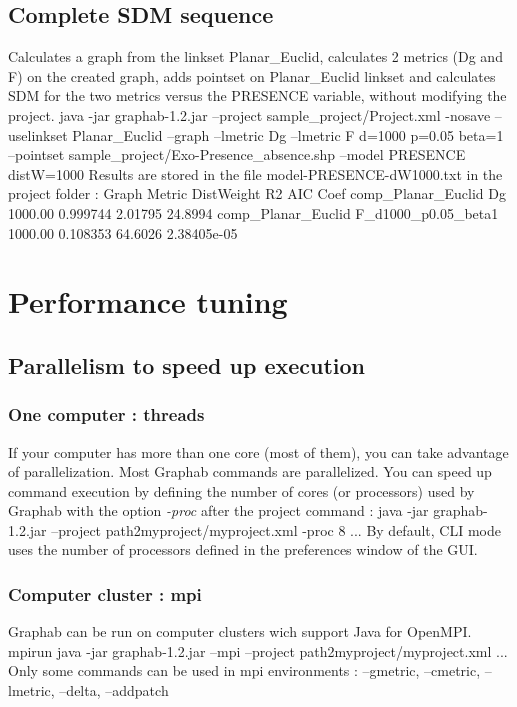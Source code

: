 \documentclass[a4paper,10pt]{report}
\newenvironment{cmd}
{\quote\Verbatim}
{\endVerbatim\endquote}
\begin{document}
\section{Complete SDM sequence}
Calculates a graph from the linkset Planar\_Euclid, calculates 2 metrics (Dg and F) on the created graph, adds pointset on Planar\_Euclid linkset 
and calculates SDM for the two metrics versus the PRESENCE variable, without modifying the project.
\begin{cmd}
java -jar graphab-1.2.jar --project sample_project/Project.xml -nosave 
  --uselinkset Planar_Euclid 
  --graph 
  --lmetric Dg --lmetric F d=1000 p=0.05 beta=1 
  --pointset sample_project/Exo-Presence_absence.shp 
  --model PRESENCE distW=1000
\end{cmd}
Results are stored in the file model-PRESENCE-dW1000.txt in the project folder :
\begin{cmd}
Graph               Metric              DistWeight R2        AIC      Coef
comp_Planar_Euclid  Dg                  1000.00    0.999744  2.01795  24.8994
comp_Planar_Euclid  F_d1000_p0.05_beta1 1000.00    0.108353  64.6026  2.38405e-05
\end{cmd}

\chapter{Performance tuning}
\section{Parallelism to speed up execution}
\subsection{One computer : threads}
If your computer has more than one core (most of them), you can take advantage of parallelization. 
Most Graphab commands are parallelized. You can speed up command execution by defining the number
of cores (or processors) used by Graphab with the option \textit{-proc} after the project command :
\begin{cmd}
java -jar graphab-1.2.jar --project path2myproject/myproject.xml -proc 8 ...
\end{cmd}
By default, CLI mode uses the number of processors defined in the preferences window of the GUI.
\subsection{Computer cluster : mpi}
Graphab can be run on computer clusters wich support Java for OpenMPI.
\begin{cmd}
mpirun java -jar graphab-1.2.jar --mpi --project path2myproject/myproject.xml ...
\end{cmd}
Only some commands can be used in mpi environments : --gmetric, --cmetric, --lmetric, --delta, --addpatch
\end{document}
